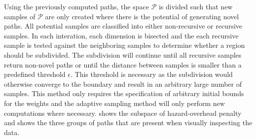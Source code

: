 Using the previously computed paths, the space $\mathcal{P}$ is divided such that new samples of $\mathcal{P}$ are only created where there is the potential of generating novel paths.  All potential samples are classified into either non-recursive or recursive samples.  In each interation, each dimension is bisected and the each recursive sample is tested against the neighboring samples to determine whether a region should be subdivided.  The subdivision will continue until all recursive samples return non-novel paths or until the distance between samples is smaller than a predefined threshold $\epsilon$.  This threshold is necessary as the subdivision would otherwise converge to the boundary and result in an arbitrary large number of samples.   This method only requires the specification of arbitrary initial bounds for the weights and the adaptive sampling method will only perform new computations where necessary.   shows the subspace of hazard-overhead penalty and shows the three groups of paths that are present when visually inspecting the data.



